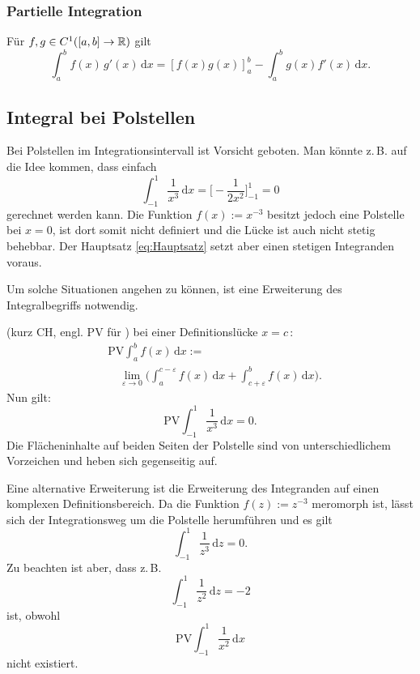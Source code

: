 \subsubsection{Partielle Integration}
Für $f,g\in C^1([a,b]\to\mathbb R)$ gilt
\begin{equation}
\int_a^b f(x)\,g'(x)\,\mathrm dx = [f(x)g(x)]_a^b
- \int_a^b g(x)f'(x)\,\mathrm dx.
\end{equation}

\subsection{Integral bei Polstellen}
Bei Polstellen im Integrationsintervall ist Vorsicht geboten.
Man könnte z.\,B. auf die Idee kommen, dass einfach%
\begin{equation}
\int_{-1}^1 \frac{1}{x^3}\,\mathrm dx
= \Big[-\frac{1}{2x^2}\Big]_{-1}^1 = 0
\end{equation}
gerechnet werden kann. Die Funktion $f(x):=x^{-3}$ besitzt jedoch eine
Polstelle bei $x=0$, ist dort somit nicht definiert und die Lücke
ist auch nicht stetig behebbar. Der Hauptsatz \eqref{eq:Hauptsatz}
setzt aber einen stetigen Integranden voraus. 

Um solche Situationen angehen zu können, ist eine Erweiterung
des Integralbegriffs notwendig.

{}
(kurz CH, engl. PV für )
bei einer Definitionslücke $x=c$\,:
\begin{equation}
\begin{split}
&\mathrm{PV}\int_a^b f(x)\,\mathrm dx :=\\
&\quad\lim_{\varepsilon\to 0}\bigg(\int_a^{c-\varepsilon} f(x)\,\mathrm dx
+\int_{c+\varepsilon}^b f(x)\,\mathrm dx\bigg).
\end{split}
\end{equation}
Nun gilt:
\begin{equation}
\mathrm{PV}\int_{-1}^1 \frac{1}{x^3}\,\mathrm dx = 0.
\end{equation}
Die Flächeninhalte auf beiden Seiten der Polstelle sind
von unterschiedlichem Vorzeichen und heben sich gegenseitig auf.

Eine alternative Erweiterung
ist die Erweiterung des Integranden auf einen komplexen
Definitionsbereich. Da die Funktion $f(z):=z^{-3}$ meromorph
ist, lässt sich der Integrationsweg um die Polstelle herumführen
und es gilt%
\begin{equation}
\int_{-1}^1 \frac{1}{z^3}\,\mathrm dz = 0.
\end{equation}
Zu beachten ist aber, dass z.\,B.
\begin{equation}
\int_{-1}^1 \frac{1}{z^2}\,\mathrm dz = -2
\end{equation}
ist, obwohl
\begin{equation}
\mathrm{PV}\int_{-1}^1 \frac{1}{x^2}\,\mathrm dx
\end{equation}
nicht existiert.

